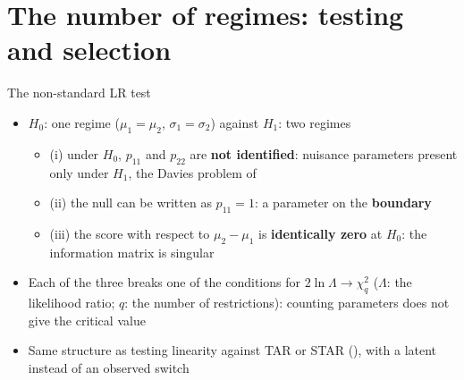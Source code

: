 \section{The number of regimes: testing and selection}

\begin{frame}{The non-standard LR test}
\itemsize{\small}
\begin{itemize}
    \item $H_0$: one regime ($\mu_1 = \mu_2$, $\sigma_1 = \sigma_2$) against $H_1$: two regimes
    \begin{itemize}
        \item (i) under $H_0$, $p_{11}$ and $p_{22}$ are \textbf{not identified}: nuisance parameters present only under $H_1$, the Davies problem of  
        \item (ii) the null can be written as $p_{11} = 1$: a parameter on the \textbf{boundary}
        \item (iii) the score with respect to $\mu_2 - \mu_1$ is \textbf{identically zero} at $H_0$: the information matrix is singular
    \end{itemize}
    \item Each of the three breaks one of the conditions for $2\ln\Lambda \to \chi^2_q$ ($\Lambda$: the likelihood ratio; $q$: the number of restrictions): counting parameters does not give the critical value
    \item Same structure as testing linearity against TAR or STAR (), with a latent instead of an observed switch
\end{itemize}
\end{frame}

